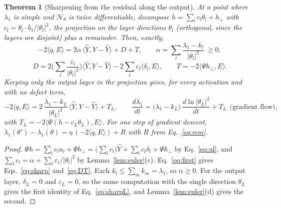\documentclass[11pt]{article}
\newtheorem{theorem}{Theorem}
\theoremstyle{definition}
\theoremstyle{remark}
\newcommand{\Net}{\mathcal{N}_\theta}
\newcommand{\ip}[2]{\langle #1,#2\rangle}
\begin{document}
\begin{theorem}[Sharpening from the residual along the output]\label{thm:sharp}
At a point where $\lambda_1$ is simple and $\Net$ is twice differentiable, decompose $h = \sum_lc_l\theta_l + h_\perp$ with $c_l = \theta_l\cdot h_l/|\theta_l|^2$, the projection on the layer directions $\theta_l$ (orthogonal, since the layers are disjoint) plus a remainder. Then, exactly,
\begin{equation}\label{eq:sharp}
-2\ip{q}{E} = 2\alpha\,\ip{\hat Y}{Y - \hat Y} + D + T,\qquad \alpha = \sum_l\frac{\lambda_1 - k_l}{|\theta_l|^2}\ \ge 0,
\end{equation}
\begin{equation}\label{eq:DT}
D = 2\Big(\sum_l\frac{\varepsilon_l}{|\theta_l|^2}\Big)\ip{\hat Y}{Y - \hat Y} - 2\sum_lc_l\ip{\delta_l}{E},\qquad T = -2\ip{\Psi h_\perp}{E} .
\end{equation}
Keeping only the output layer in the projection gives, for every activation and with no defect term,
\begin{equation}\label{eq:sharpL}
-2\ip{q}{E} = 2\,\frac{\lambda_1 - k_L}{|\theta_L|^2}\,\ip{\hat Y}{Y - \hat Y} + T_L,\qquad
\frac{d\lambda_1}{dt} = \big(\lambda_1 - k_L\big)\,\frac{d\ln|\theta_L|^2}{dt} + T_L \ \ \text{(gradient flow)},
\end{equation}
with $T_L = -2\ip{\Psi(h - c_L\theta_L)}{E}$.
For one step of gradient descent, $\lambda_1(\theta') - \lambda_1(\theta) = \eta\,(-2\ip{q}{E}) + R$ with $R$ from Eq.~\eqref{eq:rem}.
\end{theorem}

\begin{proof}
$\Psi h = \sum_lc_lu_l + \Psi h_\perp = \big(\sum_lc_l\big)\hat Y + \sum_lc_l\delta_l + \Psi h_\perp$ by Eq.~\eqref{eq:ul}, and $\sum_lc_l = \alpha + \sum_l\varepsilon_l/|\theta_l|^2$ by Lemma~\ref{lem:euler}(c). Eq.~\eqref{eq:first} gives Eqs.~\eqref{eq:sharp} and~\eqref{eq:DT}. Each $k_l\le\sum_mk_m = \lambda_1$, so $\alpha\ge0$. For the output layer, $\delta_L = 0$ and $\varepsilon_L = 0$, so the same computation with the single direction $\theta_L$ gives the first identity of Eq.~\eqref{eq:sharpL}, and Lemma~\ref{lem:euler}(d) gives the second.
\end{proof}
\end{document}
